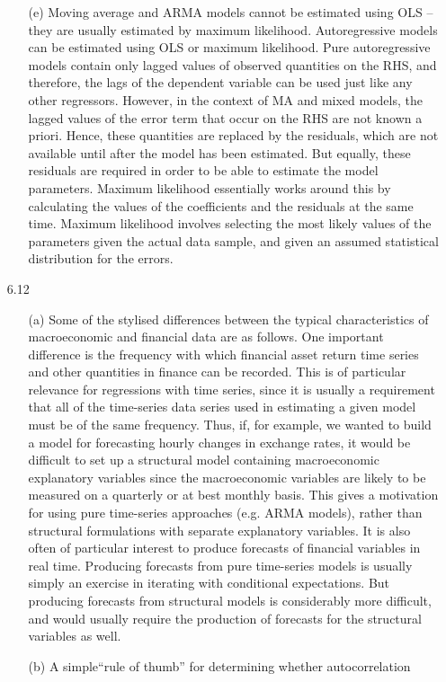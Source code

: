 \documentclass[11pt,a4paper]{article}
\begin{document}
\begin{itemize}
\begin{itemize}
\item[(e)]
Moving average and ARMA models cannot be estimated using OLS – they are
usually estimated by maximum likelihood. Autoregressive models can be
estimated using OLS or maximum likelihood. Pure autoregressive models contain
only lagged values of observed quantities on the RHS, and therefore, the lags
of the dependent variable can be used just like any other regressors. However,
in the context of MA and mixed models, the lagged values of the error term
that occur on the RHS are not known a priori. Hence, these quantities are
replaced by the residuals, which are not available until after the model has
been estimated. But equally, these residuals are required in order to be able
to estimate the model parameters. Maximum likelihood essentially works around
this by calculating the values of the coefficients and the residuals at the
same time. Maximum likelihood involves selecting the most likely values of the
 parameters given the actual data sample, and given an assumed statistical
distribution for the errors.
\end{itemize}
\item[6.12]
\begin{itemize}
\item[(a)]
 Some of the stylised differences between the typical characteristics of
macroeconomic and financial data are as follows.
One important difference is the frequency with which financial
asset return time series and other quantities in finance can be recorded. This
is of particular relevance for regressions with time series, since it is
usually a requirement that all of the time-series data series used in
estimating a given model must be of the same frequency. Thus, if, for example,
we wanted to build a model for forecasting hourly changes in exchange rates,
it would be difficult to set up a structural model containing macroeconomic
explanatory variables since the macroeconomic variables are likely to be
measured on a quarterly or at best monthly basis. This gives a motivation for
using pure time-series approaches (e.g. ARMA models), rather than structural
formulations with separate explanatory variables.
It is also often of particular interest to produce forecasts of financial
variables in real time. Producing forecasts from pure time-series models is
usually simply an exercise in iterating with conditional expectations. But
producing forecasts from structural models is considerably more difficult, and
would usually require the production of forecasts for the structural variables
as well.
\item[(b)]  A simple``rule of thumb'' for determining whether autocorrelation

\end{itemize}
\end{itemize}
\end{document}
